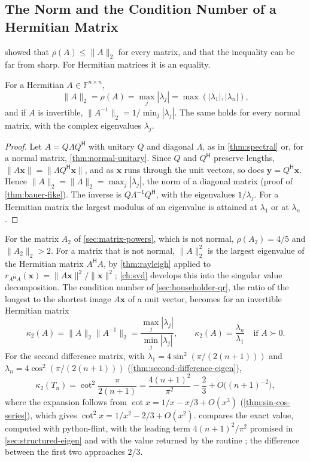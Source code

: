 \subsection{The Norm and the Condition Number of a Hermitian Matrix}

 showed that $\rho(A)\le\|A\|_2$ for every matrix, and that the inequality can be far from sharp. For Hermitian matrices it is an equality.

\begin{proposition}
\label{prop:hermitian-norm}
For a Hermitian $A\in\mathbb F^{n\times n}$,
\[
\|A\|_2=\rho(A)=\max_j|\lambda_j|=\max(|\lambda_1|,|\lambda_n|),
\]
and if $A$ is invertible, $\|A^{-1}\|_2=1/\min_j|\lambda_j|$. The same holds for every normal matrix, with the complex eigenvalues $\lambda_j$.
\end{proposition}

\begin{proof}
Let $A=Q\Lambda Q^{\mathsf H}$ with unitary $Q$ and diagonal $\Lambda$, as in \cref{thm:spectral} or, for a normal matrix, \cref{thm:normal-unitary}. Since $Q$ and $Q^{\mathsf H}$ preserve lengths, $\|A\mathbf x\|=\|\Lambda Q^{\mathsf H}\mathbf x\|$, and as $\mathbf x$ runs through the unit vectors, so does $\mathbf y=Q^{\mathsf H}\mathbf x$. Hence $\|A\|_2=\|\Lambda\|_2=\max_j|\lambda_j|$, the norm of a diagonal matrix (proof of \cref{thm:bauer-fike}). The inverse is $Q\Lambda^{-1}Q^{\mathsf H}$, with the eigenvalues $1/\lambda_j$. For a Hermitian matrix the largest modulus of an eigenvalue is attained at $\lambda_1$ or at $\lambda_n$.
\end{proof}

For the matrix $A_2$ of \cref{sec:matrix-powers}, which is not normal, $\rho(A_2)=4/5$ and $\|A_2\|_2>2$. For a matrix that is not normal, $\|A\|_2^2$ is the largest eigenvalue of the Hermitian matrix $A^{\mathsf H}A$, by \cref{thm:rayleigh} applied to $r_{A^{\mathsf H}A}(\mathbf x)=\|A\mathbf x\|^2/\|\mathbf x\|^2$; \cref{ch:svd} develops this into the singular value decomposition. The condition number of \cref{sec:householder-qr}, the ratio of the longest to the shortest image $A\mathbf x$ of a unit vector, becomes for an invertible Hermitian matrix
\[
\kappa_2(A)=\|A\|_2\|A^{-1}\|_2=\frac{\max_j|\lambda_j|}{\min_j|\lambda_j|},\qquad\kappa_2(A)=\frac{\lambda_n}{\lambda_1}\quad\text{if }A\succ0 .
\]
For the second difference matrix, with $\lambda_1=4\sin^2(\pi/(2(n+1)))$ and $\lambda_n=4\cos^2(\pi/(2(n+1)))$ (\cref{thm:second-difference-eigen}),
\[
\kappa_2(T_n)=\cot^2\frac{\pi}{2(n+1)}=\frac{4(n+1)^2}{\pi^2}-\frac23+O\bigl((n+1)^{-2}\bigr),
\]
where the expansion follows from $\cot x=1/x-x/3+O(x^3)$ (\cref{thm:sin-cos-series}), which gives $\cot^2x=1/x^2-2/3+O(x^2)$.  compares the exact value, computed with python-flint, with the leading term $4(n+1)^2/\pi^2$ promised in \cref{sec:structured-eigen} and with the value returned by the routine ; the difference between the first two approaches $2/3$.

